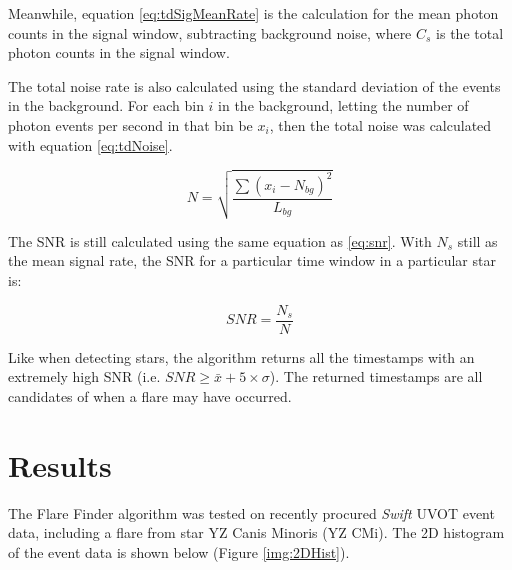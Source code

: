 \documentclass{article}
\begin{document}
\begin{multicols}{2}
Meanwhile, equation \ref{eq:tdSigMeanRate} is the calculation for the mean photon counts in the signal window, subtracting background noise, where \(C_s\) is the total photon counts in the signal window. 

The total noise rate is also calculated using the standard deviation of the events in the background. For each bin $i$ in the background, letting the number of photon events per second in that bin be $x_i$, then the total noise was calculated with equation \ref{eq:tdNoise}.

\begin{equation} \label{eq:tdNoise}
    N = \sqrt{\frac{\sum{(x_i - N_{bg})^2}}{L_{bg}}}
\end{equation}

The SNR is still calculated using the same equation as \ref{eq:snr}. With \(N_s\) still as the mean signal rate, the SNR for a particular time window in a particular star is:

\begin{equation}
    SNR = \frac{N_s}{N}
\end{equation}

Like when detecting stars, the algorithm returns all the timestamps with an extremely high SNR (i.e. \(SNR \geq \bar{x} + 5 \times \sigma\)). The returned timestamps are all candidates of when a flare may have occurred. 

\section{Results}

The Flare Finder algorithm was tested on recently procured \textit{Swift} UVOT event data, including a flare from star YZ Canis Minoris (YZ CMi). The 2D histogram of the event data is shown below (Figure \ref{img:2DHist}). 

\end{multicols}
\end{document}
